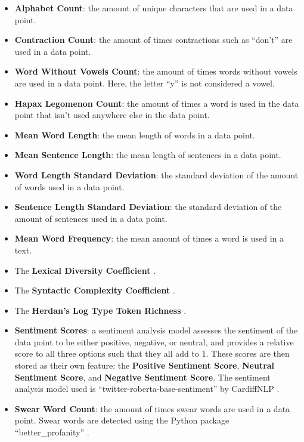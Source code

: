 \documentclass{article}
\begin{document}
\begin{itemize}
  \item \textbf{Alphabet Count}: the amount of unique characters that are used in a data point.
  \item \textbf{Contraction Count}: the amount of times contractions such as ``don't'' are used in a data point.
  \item \textbf{Word Without Vowels Count}: the amount of times words without vowels are used in a data point. Here, the letter ``y'' is not considered a vowel.
  \item \textbf{Hapax Legomenon Count}: the amount of times a word is used in the data point that isn't used anywhere else in the data point.
  \item \textbf{Mean Word Length}: the mean length of words in a data point.
  \item \textbf{Mean Sentence Length}: the mean length of sentences in a data point.
  \item \textbf{Word Length Standard Deviation}: the standard deviation of the amount of words used in a data point.
  \item \textbf{Sentence Length Standard Deviation}: the standard deviation of the amount of sentences used in a data point.
  \item \textbf{Mean Word Frequency}: the mean amount of times a word is used in a text.
  \item The \textbf{Lexical Diversity Coefficient} \cite{hlavcheva2021languageindependentfeatures}.
  \item The \textbf{Syntactic Complexity Coefficient} \cite{hlavcheva2021languageindependentfeatures}.
  \item The \textbf{Herdan's Log Type Token Richness} \cite{hess1989reliabilitytypetoken}.
  \item \textbf{Sentiment Scores}: a sentiment analysis model assesses the sentiment of the data point to be either positive, negative, or neutral, and provides a relative score to all three options such that they all add to 1. These scores are then stored as their own feature: the \textbf{Positive Sentiment Score}, \textbf{Neutral Sentiment Score}, and \textbf{Negative Sentiment Score}. The sentiment analysis model used is ``twitter-roberta-base-sentiment'' by CardiffNLP \cite{barbieri2020tweeteval}.
  \item \textbf{Swear Word Count}: the amount of times swear words are used in a data point. Swear words are detected using the Python package ``better\_profanity'' \cite{nguyen2026snguyenthanhbetterprofanity}.
\end{itemize}
\end{document}
